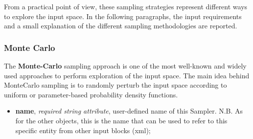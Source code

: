 From a practical point of view, these sampling strategies represent different
ways to explore the input space.
%
In the following paragraphs, the input requirements and a small explanation of
the different sampling methodologies are reported.


\subsubsection{Monte Carlo}
\label{subsubsubsec:MC}
The \textbf{Monte-Carlo} sampling approach is one of the most well-known and
widely used approaches to perform exploration of the input space.
%
The main idea behind MonteCarlo sampling is to  randomly perturb the input space according
to uniform or parameter-based probability density functions.
%

%
\attrsIntro
\vspace{-5mm}
\begin{itemize}
\itemsep0em
\item \textbf{name}, \textit{required string attribute}, user-defined name of this Sampler. N.B. As for the other objects, this is the name that can be used to refer to this specific entity from other input blocks (xml);
\end{itemize}
\vspace{-5mm}

